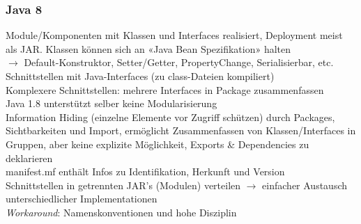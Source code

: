 \documentclass[a4paper]{article}
\begin{document}
	\subsubsection{Java 8}
	Module/Komponenten mit Klassen und Interfaces realisiert, Deployment meist als JAR. 
	Klassen können sich an «Java Bean Spezifikation» halten \\ 
	\indent $\rightarrow$ Default-Konstruktor, Setter/Getter, PropertyChange, Serialisierbar, etc. \\
	Schnittstellen mit Java-Interfaces (zu class-Dateien kompiliert) \\
	Komplexere Schnittstellen: mehrere Interfaces in Package zusammenfassen \\
	Java 1.8 unterstützt selber keine Modularisierung \\
	Information Hiding (einzelne Elemente vor Zugriff schützen) durch Packages, Sichtbarkeiten und Import, ermöglicht Zusammenfassen von Klassen/Interfaces in Gruppen, aber keine explizite Möglichkeit, Exports \& Dependencies zu deklarieren \\
	manifest.mf enthält Infos zu Identifikation, Herkunft und Version \\
	Schnittstellen in getrennten JAR’s (Modulen) verteilen $\rightarrow$ einfacher Austausch unterschiedlicher Implementationen \\
	\textit{Workaround}: Namenskonventionen und hohe Disziplin \\
	
\end{document}
